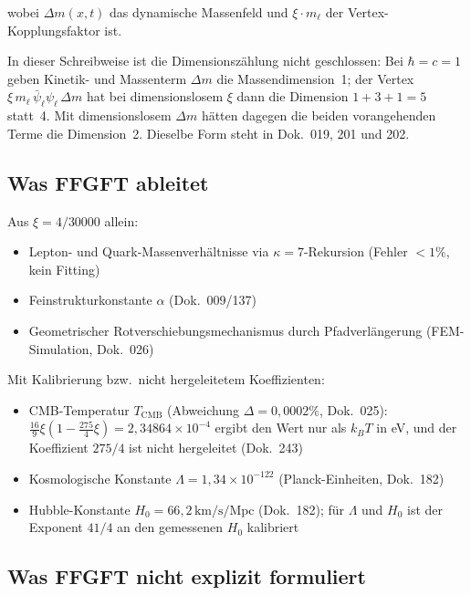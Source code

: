 wobei $\Delta m(x,t)$ das dynamische Massenfeld und $\xi \cdot m_\ell$ der
Vertex-Kopplungsfaktor ist.

In dieser Schreibweise ist die Dimensionszählung nicht geschlossen: Bei $\hbar = c = 1$ geben Kinetik- und Massenterm $\Delta m$ die Massendimension~1; der Vertex $\xi\,m_\ell\,\bar\psi_\ell\psi_\ell\,\Delta m$ hat bei dimensionslosem $\xi$ dann die Dimension $1+3+1 = 5$ statt~4. Mit dimensionslosem $\Delta m$ hätten dagegen die beiden vorangehenden Terme die Dimension~2. Dieselbe Form steht in Dok.~019, 201 und 202.

\subsection{Was FFGFT ableitet}

Aus $\xi = 4/30000$ allein:

\begin{itemize}
  \item Lepton- und Quark-Massenverhältnisse via $\kappa=7$-Rekursion
        (Fehler $<1\%$, kein Fitting)
  \item Feinstrukturkonstante $\alpha$ (Dok.~009/137)
  \item Geometrischer Rotverschiebungsmechanismus durch Pfadverlängerung
        (FEM-Simulation, Dok.~026)
\end{itemize}

Mit Kalibrierung bzw.\ nicht hergeleitetem Koeffizienten:

\begin{itemize}
  \item CMB-Temperatur $T_\text{CMB}$ (Abweichung $\Delta = 0{,}0002\%$, Dok.~025):
        $\tfrac{16}{9}\xi(1-\tfrac{275}{4}\xi) = 2{,}34864\times10^{-4}$ ergibt den
        Wert nur als $k_BT$ in eV, und der Koeffizient $275/4$ ist nicht
        hergeleitet (Dok.~243)
  \item Kosmologische Konstante $\Lambda = 1{,}34\times10^{-122}$
        (Planck-Einheiten, Dok.~182)
  \item Hubble-Konstante $H_0 = 66{,}2\,\text{km/s/Mpc}$ (Dok.~182);
        für $\Lambda$ und $H_0$ ist der Exponent $41/4$ an den gemessenen
        $H_0$ kalibriert
\end{itemize}

\subsection{Was FFGFT nicht explizit formuliert}

